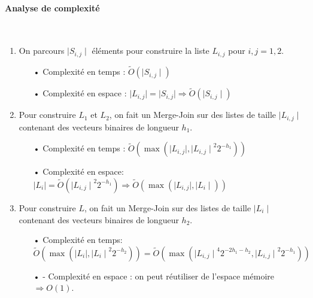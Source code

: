 \documentclass[12pt,openany]{report}
\begin{document}
\paragraph{Analyse de complexité } \cite{Ghazal}\\

\begin{enumerate}
\item On parcours $ \mid S_{i,j} \mid $ éléments pour construire la liste $L_{i,j}  $ pour $ i,j=1,2 $.
\begin{itemize}
\item[•] Complexité en temps : $ \tilde{O}(\mid S_{i,j} \mid)  $
\item[•] Complexité en espace : $ \mid L_{i,j} \mid = \mid S_{i,j} \mid \Rightarrow \tilde{O}(\mid S_{i,j} \mid)$
\end{itemize}
\item Pour construire $L_1$ et $L_2$, on fait un Merge-Join sur des listes de taille
$\mid L_{i,j} \mid$ contenant des vecteurs binaires de longueur $h_1$.
\begin{itemize}
\item[•] Complexité en temps : $\tilde{O}\left( \max\left( \mid L_{i,j} \mid ,{ \mid L_{i,j}  \mid}^{2}2^{-{h_1}}\right)  \right)   $
\item[•] Complexité en espace: $ \mid L_i \mid =\tilde{O}\left( {\mid L_{i,j} \mid}^{2}2^{-{h_1}}  \right)\Rightarrow \tilde{O}\left(  \max\left( \mid L_{i,j} \mid,\mid L_i \mid \right)  \right)   $ 
\end{itemize}

\item Pour construire $L$, on fait un Merge-Join sur des listes de taille $ \mid L_i \mid $
contenant des vecteurs binaires de longueur $h_2$.

\begin{itemize}
\item[•] Complexité en temps: 
$\tilde{O}\left( \max\left( \mid L_{i} \mid ,{ \mid L_{i}  \mid}^{2}2^{-{h_2}}\right)  \right) = \tilde{O}\left( \max\left( {\mid L_{i,j} \mid}^{4}2^{-2{h_1}-{h_2}} ,{ \mid L_{i,j}  \mid}^{2}2^{-{h_1}}\right)  \right)    $
\item[•] - Complexité en espace : on peut réutiliser de l’espace mémoire $ \Rightarrow O(1)$.

\end{itemize}

\end{enumerate}
\end{document}
